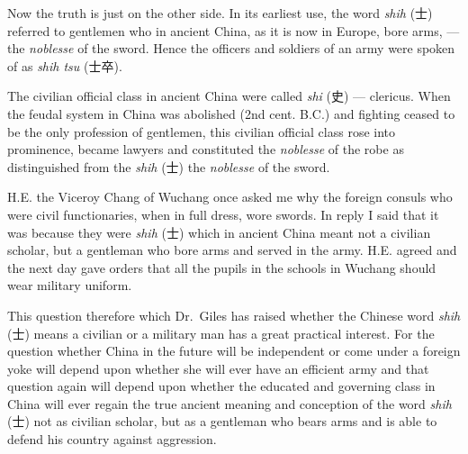 Now the truth is just on the other side.
In its earliest use, the word \emph{shih} (士) referred to gentlemen who in ancient China, as it is now in Europe, bore arms, --- the \emph{noblesse} of the sword.
Hence the officers and soldiers of an army were spoken of as \emph{shih tsu} (士卒).

The civilian official class in ancient China were called \emph{shi} (史) --- clericus.
When the feudal system in China was abolished (2nd cent. B.C.) and fighting ceased to be the only profession of gentlemen, this civilian official class rose into prominence, became lawyers and constituted the \emph{noblesse} of the robe as distinguished from the \emph{shih} (士) the \emph{noblesse} of the sword.

H.E.  the Viceroy Chang of Wuchang once asked me why the foreign consuls who were civil functionaries, when in full dress, wore swords.
In reply I said that it was because they were \emph{shih} (士) which in ancient China meant not a civilian scholar, but a gentleman who bore arms and served in the army.
H.E. agreed and the next day gave orders that all the pupils in the schools in Wuchang should wear military uniform.

This question therefore which Dr.~Giles has raised whether the Chinese word \emph{shih} (士) means a civilian or a military man has a great practical interest.
For the question whether China in the future will be independent or come under a foreign yoke will depend upon whether she will ever have an efficient army and that question again will depend upon whether the educated and governing class in China will ever regain the true ancient meaning and conception of the word \emph{shih} (士) not as civilian scholar, but as a gentleman who bears arms and is able to defend his country against aggression. 


